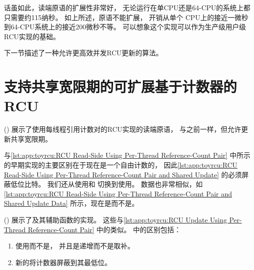 话虽如此，读端原语的扩展性非常好，
无论运行在单CPU还是64-CPU的系统上都只需要约115纳秒。
如上所述，原语不能扩展，
开销从单个 CPU上的接近一微秒到64-CPU系统上的接近200微秒不等。
可以想象这个实现可以作为生产级用户级RCU实现的基础。

下一节描述了一种允许更高效并发RCU更新的算法。

\section{支持共享宽限期的可扩展基于计数器的RCU}
\label{sec:app:toyrcu:Scalable Counter-Based RCU With Shared Grace Periods}

()
展示了使用每线程引用计数对的RCU实现的读端原语，
与之前一样，但允许更新共享宽限期。
\begin{fcvref}
与\cref{lst:app:toyrcu:RCU Read-Side Using Per-Thread Reference-Count Pair}
中所示的早期实现的主要区别在于现在是一个自由计数的，
因此\cref{lst:app:toyrcu:RCU Read-Side Using Per-Thread Reference-Count Pair and Shared Update}
的必须屏蔽低位比特。
我们还从使用和
切换到使用。
数据也非常相似，如
\cref{lst:app:toyrcu:RCU Read-Side Using Per-Thread Reference-Count Pair and Shared Update Data}
所示，现在是而不是。
\end{fcvref}

\begin{listing}

\caption{使用每线程引用计数对和共享更新数据的RCU读端数据}
\label{lst:app:toyrcu:RCU Read-Side Using Per-Thread Reference-Count Pair and Shared Update Data}
\end{listing}

\begin{listing}

\caption{使用每线程引用计数对和共享更新的RCU读端}
\label{lst:app:toyrcu:RCU Read-Side Using Per-Thread Reference-Count Pair and Shared Update}
\end{listing}

()
展示了及其辅助函数的实现。
这些与\cref{lst:app:toyrcu:RCU Update Using Per-Thread Reference-Count Pair}
中的类似。
中的区别包括：
\begin{fcvref}
\begin{enumerate}
\item	{}使用而不是，
	并且是递增而不是取补。
\item	新的将计数器屏蔽到其最低位。
\end{enumerate}
\end{fcvref}

